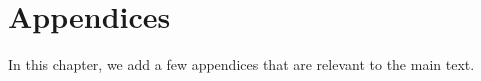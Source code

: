 \chapter*{Appendices}
\thispagestyle{empty}

In this chapter, we add a few appendices that are relevant to the main text.

\renewcommand{\thesection}{\Alph{section}}
\setcounter{section}{0}



